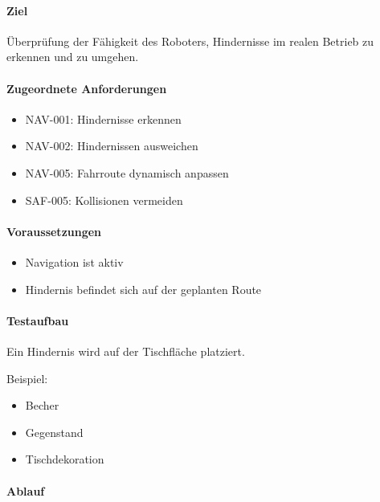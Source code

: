 \paragraph{Ziel}\label{ziel-26}

Überprüfung der Fähigkeit des Roboters, Hindernisse im realen Betrieb zu
erkennen und zu umgehen.

\paragraph{Zugeordnete
Anforderungen}\label{zugeordnete-anforderungen-26}

\begin{itemize}
\tightlist
\item
  NAV-001: Hindernisse erkennen
\item
  NAV-002: Hindernissen ausweichen
\item
  NAV-005: Fahrroute dynamisch anpassen
\item
  SAF-005: Kollisionen vermeiden
\end{itemize}

\paragraph{Voraussetzungen}\label{voraussetzungen-25}

\begin{itemize}
\tightlist
\item
  Navigation ist aktiv
\item
  Hindernis befindet sich auf der geplanten Route
\end{itemize}

\paragraph{Testaufbau}\label{testaufbau-2}

Ein Hindernis wird auf der Tischfläche platziert.

Beispiel:

\begin{itemize}
\tightlist
\item
  Becher
\item
  Gegenstand
\item
  Tischdekoration
\end{itemize}

\paragraph{Ablauf}\label{ablauf-26}

